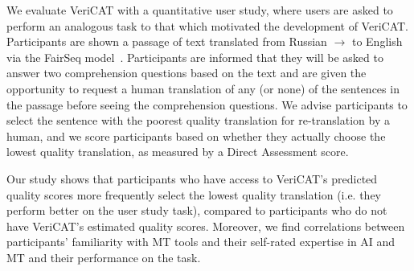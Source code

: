 
We evaluate VeriCAT with a quantitative %
user study, where users are asked to perform an analogous task to that which motivated the development of VeriCAT. Participants are shown a passage of text translated from Russian $\rightarrow$ to English via the FairSeq model~\cite{ott-etal-2019-fairseq}. Participants are informed that they will be asked to answer two comprehension questions based on the text and are given the opportunity to request a human translation of any (or none) of the sentences in the passage before seeing the comprehension questions. We advise participants to select the sentence with the poorest quality translation for re-translation by a human, and we score participants based on whether they actually choose the lowest quality translation, as measured by a Direct Assessment score. 

Our study shows that participants who have access to VeriCAT's predicted quality scores more frequently select the lowest quality translation (i.e. they perform better on the user study task), compared to participants who do not have VeriCAT's estimated quality scores. Moreover, we find correlations between participants' familiarity with MT tools and their self-rated expertise in AI and MT and their performance on the task. 

